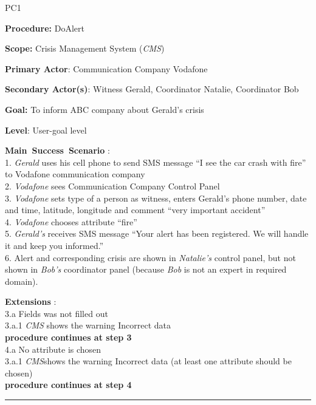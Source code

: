 \begin{lyxlist}{PC1}
\small{
\item [\textbf{Procedure:}] DoAlert
\item [\textbf{Scope:}] Crisis Management System (\emph{CMS})
\item [\textbf{Primary Actor}:] Communication Company Vodafone
\item [\textbf{Secondary Actor(s)}:] Witness Gerald, Coordinator Natalie, Coordinator Bob
\item [\textbf{Goal:}] To inform ABC company about Gerald's crisis
\item [\textbf{Level}:] User-goal level

\item [\textbf{Main~Success~Scenario}]:\\
1. \emph{Gerald} uses his cell phone to send SMS message ``I see the car crash
with fire'' to Vodafone communication company\\
2. \emph{Vodafone} sees Communication Company Control Panel\\
3. \emph{Vodafone} sets type of a person as witness, enters Gerald's phone
number, date and time, latitude, longitude and comment ``very important
accident''\\
4. \emph{Vodafone} chooses attribute ``fire''\\
5. \emph{Gerald's} receives SMS message ``Your alert has been registered. We
will handle it and keep you informed.''\\
6. Alert and corresponding crisis are shown in \emph{Natalie's} control panel,
but not shown in \emph{Bob’s} coordinator panel (because \emph{Bob} is not an
expert in required domain).

\item [\textbf{Extensions}]:\\
3.a Fields was not filled out\\
\hspace*{0.5cm} 3.a.1 \emph{CMS} shows the warning Incorrect data\\
\hspace*{0.5cm} \textbf{procedure continues at step 3}\\
4.a No attribute is chosen\\
\hspace*{0.5cm} 3.a.1 \emph{CMS}shows the warning Incorrect data 
(at least one attribute should be chosen)\\
\hspace*{0.5cm} \textbf{procedure continues at step 4}
}
\end{lyxlist}
\hrule
\vspace{0.5cm}


